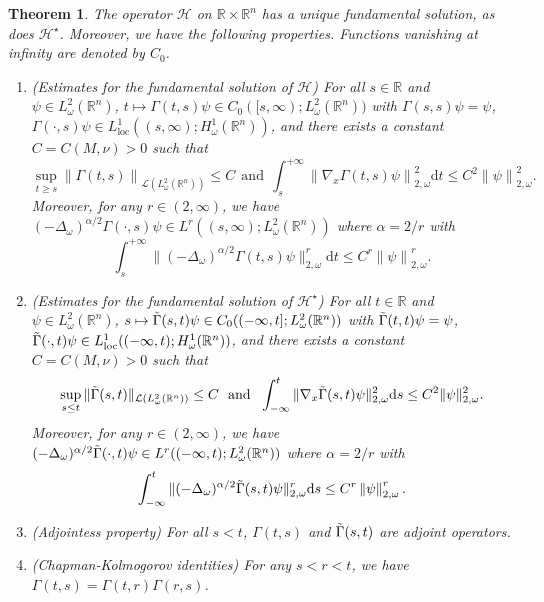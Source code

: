 \documentclass[12pt, letterpaper]{amsart}
\newtheorem{thm}{Theorem}[section]
\theoremstyle{definition}
\theoremstyle{remark}
\numberwithin{equation}{section}
\begin{document}
\begin{thm}\label{thm:FundSol}
The operator $\mathcal{H}$ on $\mathbb{R} \times \mathbb{R}^n$ has a unique fundamental solution, as does $\mathcal{H}^\star$. Moreover, we have the following properties. Functions vanishing at infinity are denoted by $C_0$.
\begin{enumerate}[label=\Alph*)]
    \item (Estimates for the fundamental solution of $\mathcal{H}$) For all $s \in \mathbb{R}$ and $\psi \in L^2_\omega(\mathbb{R}^n)$, $t \mapsto \Gamma(t,s)\psi \in C_0([s,\infty);L^2_\omega(\mathbb{R}^n))$ with $ \Gamma(s,s)\psi =\psi $, $\Gamma(\cdot,s)\psi \in L^1_{\mathrm{loc}}((s,\infty);H^1_\omega(\mathbb{R}^n))$, and there exists a constant $C=C(M,\nu)>0$ such that
    \begin{equation*}
        \sup_{t \geq s} \left \| \Gamma(t,s)  \right \|_{\mathcal{L}(L^2_\omega(\mathbb{R}^n))} \leq C \ \ \mathrm{and} \ \  \int_{s}^{+\infty} \left \| \nabla_x \Gamma(t,s)\psi \right \|^2_{2,\omega}\mathrm d t \leq C^2 \left \| \psi \right \|_{2,\omega}^2.
    \end{equation*}
    Moreover, for any $r \in (2,\infty)$, we have $(-\Delta_\omega)^{\alpha/2}\Gamma(\cdot,s)\psi \in L^r((s,\infty);L^2_\omega(\mathbb{R}^n))$ where $\alpha={2}/{r}$ with
    \begin{equation*}
        \int_{s}^{+\infty}  \|(-\Delta_\omega)^{\alpha/2} \Gamma(t,s)\psi \|^r_{2,\omega}\mathrm d t \leq C^r \left \| \psi \right \|_{2,\omega}^r.
    \end{equation*}
    \item (Estimates for the fundamental solution of $\mathcal{H}^\star$) For all $t \in \mathbb{R}$ and $\psi \in L^2_\omega(\mathbb{R}^n)$, $s \mapsto \Tilde{\Gamma}(s,t)\psi \in C_0((-\infty,t];L^2_\omega(\mathbb{R}^n))$ with $\Tilde{\Gamma}(t,t)\psi =\psi$, $\Tilde{\Gamma}(\cdot,t)\psi \in L^1_{\mathrm{loc}}((-\infty,t);H^1_\omega(\mathbb{R}^n))$, and there exists a constant $C=C(M,\nu)>0$ such that
    \begin{equation*}
       \sup_{s \leq t}  \| \Tilde{\Gamma}(s,t)   \|_{\mathcal{L}(L^2_\omega(\mathbb{R}^n))} \leq C \ \ \mathrm{and} \ \ \int_{-\infty}^{t}  \| \nabla_x \Tilde{\Gamma}(s,t) \psi \|^2_{2,\omega}\mathrm d s \leq C^2 \| \psi  \|_{2,\omega}^2.
    \end{equation*}
    Moreover, for any $r \in (2,\infty)$, we have $(-\Delta_\omega)^{\alpha/2}\Tilde{\Gamma}(\cdot,t)\psi \in L^r((-\infty,t);L^2_\omega(\mathbb{R}^n))$ where $\alpha={2}/{r}$ with
    \begin{equation*}
        \int_{-\infty}^{t}  \|(-\Delta_\omega)^{\alpha/2} \Tilde{\Gamma}(s,t)\psi \|^r_{2,\omega}\mathrm d s \leq C^r \left \| \psi \right \|_{2,\omega}^r.
    \end{equation*}
    \item (Adjointess property) For all $s <t $, $\Gamma(t,s)$ and $\Tilde{\Gamma}(s,t)$ are  adjoint operators.
    \item (Chapman-Kolmogorov identities) For any $s < r <t $, we have $\Gamma(t,s)=\Gamma(t,r)\Gamma(r,s)$.
\end{enumerate}
\end{thm}
\end{document}
